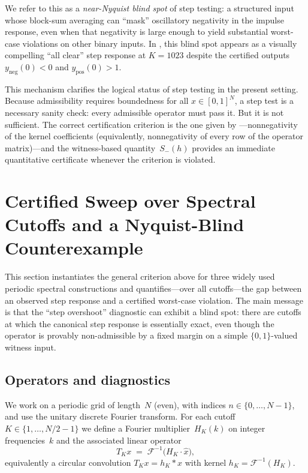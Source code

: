 \documentclass[11pt,a4paper]{article}
\theoremstyle{plain}
\theoremstyle{definition}
\theoremstyle{plain}
\newcommand{\Sminus}{S_{-}}
\begin{document}
We refer to this as a \emph{near-Nyquist blind spot} of step testing: a
structured input whose block-sum averaging can ``mask'' oscillatory negativity in
the impulse response, even when that negativity is large enough to yield
substantial worst-case violations on other binary inputs.  In ,
this blind spot appears as a visually compelling ``all clear'' step response at
$K = 1023$ despite the certified outputs $y_{\mathrm{neg}}(0) < 0$ and
$y_{\mathrm{pos}}(0) > 1$.

This mechanism clarifies the logical status of step testing in the present
setting.  Because admissibility requires boundedness for all $x \in [0,1]^N$, a
step test is a necessary sanity check: every admissible operator must pass it.
But it is not sufficient.  The correct certification criterion is the one given
by ---nonnegativity of the kernel coefficients (equivalently,
nonnegativity of every row of the operator matrix)---and the witness-based
quantity~$\Sminus(h)$ provides an immediate quantitative certificate whenever the
criterion is violated.


\section{Certified Sweep over Spectral Cutoffs and a Nyquist-Blind
  Counterexample}
\label{sec:sweep}

This section instantiates the general criterion above for three widely used
periodic spectral constructions and quantifies---over all cutoffs---the gap
between an observed step response and a certified worst-case violation.  The main
message is that the ``step overshoot'' diagnostic can exhibit a blind spot: there
are cutoffs at which the canonical step response is essentially exact, even
though the operator is provably non-admissible by a fixed margin on a simple
$\{0,1\}$-valued witness input.


\subsection{Operators and diagnostics}
\label{sec:ops-diag}

We work on a periodic grid of length~$N$ (even), with indices
$n \in \{0,\dots,N-1\}$, and use the unitary discrete Fourier transform.  For
each cutoff $K \in \{1,\dots,N/2-1\}$ we define a Fourier multiplier~$H_K(k)$
on integer frequencies~$k$ and the associated linear operator
\[
  T_K x
  \;=\;
  \mathcal{F}^{-1}\!\bigl(H_K \cdot \widehat{x}\bigr),
\]
equivalently a circular convolution $T_K x = h_K * x$ with kernel
$h_K = \mathcal{F}^{-1}(H_K)$.
\end{document}
